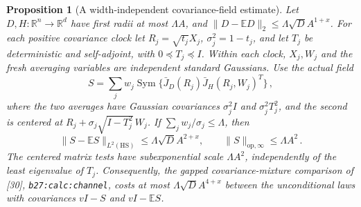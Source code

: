 \documentclass[11pt]{article}
\numberwithin{equation}{section}
\newtheorem{proposition}[theorem]{Proposition}
\theoremstyle{remark}\newtheorem{remark}[theorem]{Remark}
\newcommand{\R}{\mathbb R}\newcommand{\E}{\mathbb E}
\newcommand{\Sym}{\operatorname{Sym}}\newcommand{\HS}{\mathrm{HS}}
\newcommand{\op}{\mathrm{op}}\newcommand{\LL}{\Lambda}
\newcommand{\norm}[1]{\lVert#1\rVert}
\newcommand{\src}[1]{\texttt{\nolinkurl{#1}}}
\begin{document}
\begin{proposition}[A width-independent covariance-field estimate]
\label{prop:field-mixture}
Let $D,H:\R^n\to\R^d$ have first radii at most $\LL A$, and
$\norm{D-\E D}_2\le\LL\sqrt D A^{1+x}$. For each positive covariance
clock let $R_j=\sqrt{t_j}X_j$, $\sigma_j^2=1-t_j$, and let
$T_j$ be deterministic and self-adjoint, with $0\preceq T_j\preceq I$.
Within each clock, $X_j,W_j$ and the fresh averaging variables are
independent standard Gaussians. Use the actual field
\[
 S=\sum_jw_j\Sym\bigl\{\bar J_D(R_j)
                         \bar J_H(R_j,W_j)^T\bigr\}\,,
\]
where the two averages have Gaussian covariances $\sigma_j^2I$
and $\sigma_j^2T_j^2$, and the second is centered at
$R_j+\sigma_j\sqrt{I-T_j^2}\,W_j$.
If $\sum_jw_j/\sigma_j\le\LL$, then
\[
 \norm{S-\E S}_{L^2(\HS)}\le\LL\sqrt D A^{2+x},
 \qquad \norm S_{\op,\infty}\le\LL A^2\,.
\]
The centered matrix tests have subexponential scale $\LL A^2$,
independently of the least eigenvalue of $T_j$. Consequently, the
gapped covariance-mixture comparison of [30], \src{b27:calc:channel},
costs at most $\LL\sqrt D A^{4+x}$ between the unconditional laws
with covariances $vI-S$ and $vI-\E S$.
\end{proposition}
\end{document}
